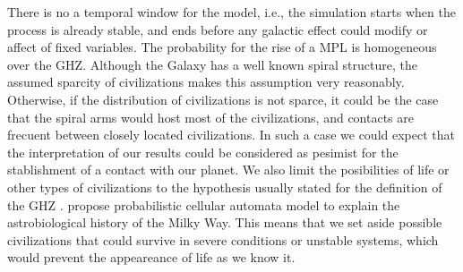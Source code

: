 There is no a temporal window for the model, i.e., the simulation
starts when the process is already stable, and ends before any
galactic effect could modify or affect of fixed variables.
%
The probability for the rise of a MPL is homogeneous over the GHZ.
%
Although the Galaxy has a well known spiral structure, the assumed
sparcity of civilizations makes this assumption very reasonably.
%
Otherwise, if the distribution of civilizations is not sparce, it
could be the case that the spiral arms would host most of the
civilizations, and contacts are frecuent between closely located
civilizations.
%
In such a case we could expect that the interpretation of our results
could be considered as pesimist for the stablishment of a contact with
our planet.
%
We also limit the posibilities of life or other types of civilizations
to the hypothesis usually stated for the definition of the GHZ
\citep{dayal_habitability_2016,gonzalez_galactic_2001,lineweaver_galactic_2004,gonzalez_habitable_2005,morrison_extending_2015,haqq-misra_evolution_2019,rahvar_cosmic_2016,gobat_evolution_2016,
rahvar_cosmic_2016}.
%
\citet{vukotic_astrobiological_2012} propose probabilistic cellular
automata model to explain the astrobiological history of the Milky
Way.
%
This means that we set aside possible civilizations that could survive
in severe conditions or unstable systems, which would prevent the
appeareance of life as we know it.

